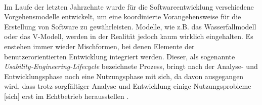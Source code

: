 \\
Im Laufe der letzten Jahrzehnte wurde für die Softwareentwicklung verschiedene Vorgehensmodelle entwickelt, um eine koordinierte Vorangehensweise für die Erstellung von Software zu gewährleisten. Modelle, wie z.B. das Wasserfallmodell oder das V-Modell, werden in der Realität jedoch kaum wirklich eingehalten. Es enstehen immer wieder Mischformen, bei denen Elemente der benutzerorientierten Entwicklung integriert werden. Dieser, als sogenannte \textit{Usability-Engineering-Lifecycle} bezeichnete Prozess, bringt nach der Analyse- und Entwicklungsphase noch eine Nutzungsphase mit sich, da davon ausgegangen wird, dass \glqq trotz sorgfältiger Analyse und Entwicklung einige Nutzungsprobleme [sich] erst im Echtbetrieb herausstellen\grqq{} \cite{lifecycle}.





